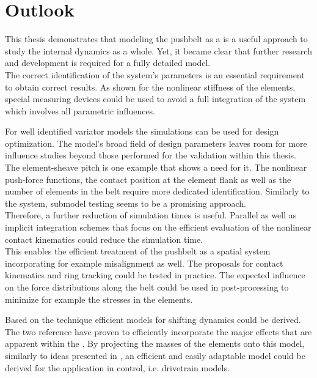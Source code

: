 \section{Outlook}

This thesis demonstrates that modeling the pushbelt \CVT as a \MBS is a useful approach to study the internal dynamics as a whole. 
Yet, it became clear that further research and development is required for a fully detailed model.\\
The correct identification of the system's parameters is an essential requirement to obtain correct results. 
As shown for the nonlinear stiffness of the elements, special measuring devices could be used to avoid a full integration of the system which involves all parametric influences.\par

For well identified variator models the simulations can be used for design optimization. 
The model's broad field of design parameters leaves room for more influence studies beyond those performed for the validation within this thesis.\\
The element-sheave pitch is one example that shows a need for it.
The nonlinear push-force functions, the contact position at the element flank as well as the number of elements in the belt require more dedicated identification.
Similarly to the \PFT system, submodel testing seems to be a promising approach.\\
Therefore, a further reduction of simulation times is useful.
Parallel as well as implicit integration schemes that focus on the efficient evaluation of the nonlinear contact kinematics could reduce the simulation time.\\
This enables the efficient treatment of the pushbelt \CVT as a spatial system incorporating for example misalignment as well. 
The proposals for contact kinematics and ring tracking could be tested in practice.
The expected influence on the force distributions along the belt could be used in post-processing to minimize for example the stresses in the elements.\par

Based on the \ALE technique efficient models for shifting dynamics could be derived.
The two reference \DOFs have proven to efficiently incorporate the major effects that are apparent within the \CVT. 
By projecting the masses of the elements onto this model, similarly to ideas presented in \cite{bullinger_dynamik_2005}, an efficient and easily adaptable model could be derived for the application in control, i.e. drivetrain models.


